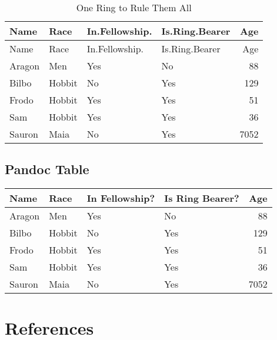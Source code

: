 \documentclass[
]{article}
\begin{document}
\begin{longtable}[]{@{}llllr@{}}
\caption{One Ring to Rule Them All}\tabularnewline
\toprule
Name & Race & In.Fellowship. & Is.Ring.Bearer & Age\tabularnewline
\midrule
\endfirsthead
\toprule
Name & Race & In.Fellowship. & Is.Ring.Bearer & Age\tabularnewline
\midrule
\endhead
Aragon & Men & Yes & No & 88\tabularnewline
Bilbo & Hobbit & No & Yes & 129\tabularnewline
Frodo & Hobbit & Yes & Yes & 51\tabularnewline
Sam & Hobbit & Yes & Yes & 36\tabularnewline
Sauron & Maia & No & Yes & 7052\tabularnewline
\bottomrule
\end{longtable}

\hypertarget{pandoc-table}{%
\subsection{Pandoc Table}\label{pandoc-table}}

\begin{longtable}[]{@{}llllr@{}}
\toprule
Name & Race & In Fellowship? & Is Ring Bearer? & Age\tabularnewline
\midrule
\endhead
Aragon & Men & Yes & No & 88\tabularnewline
Bilbo & Hobbit & No & Yes & 129\tabularnewline
Frodo & Hobbit & Yes & Yes & 51\tabularnewline
Sam & Hobbit & Yes & Yes & 36\tabularnewline
Sauron & Maia & No & Yes & 7052\tabularnewline
\bottomrule
\end{longtable}

\hypertarget{references}{%
\section{References}\label{references}}
\end{document}
